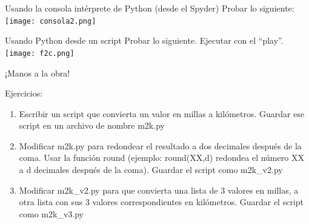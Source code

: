 \documentclass{beamer}
\begin{document}
\begin{frame}{Usando la consola intérprete de Python (desde el Spyder)}
Probar lo siguiente:
\texttt{[image: consola2.png]}

\end{frame}


\begin{frame}{Usando Python desde un script}
Probar lo siguiente. Ejecutar con el ``play''.
\texttt{[image: f2c.png]}

\end{frame}




\begin{frame}{¡Manos a la obra!}
\begin{block}{Ejercicios:}
	\begin{enumerate}
		\item Escribir un script que convierta un valor en millas a kilómetros. Guardar ese script en un archivo de nombre m2k.py
		\item Modificar m2k.py para redondear el resultado a dos decimales después de la coma. Usar la función round (ejemplo: round(XX,d) redondea el número XX a d decimales después de la coma). Guardar el script como m2k\_v2.py
		\item Modificar m2k\_v2.py para que convierta una lista de 3 valores en millas, a otra lista con sus 3 valores correspondientes en kilómetros.  Guardar el script como m2k\_v3.py
	\end{enumerate}
	
\end{block}
\end{frame}
\end{document}
